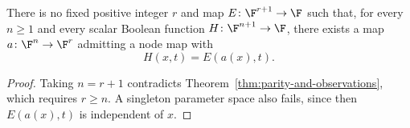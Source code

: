 \begin{corollary}\label{cor:no-universal-evaluation}
There is no fixed positive integer $r$ and map $E\colon\F^{r+1}\to\F$ such that, for every $n\geq1$ and every scalar Boolean function $H\colon\F^{n+1}\to\F$, there exists a map $a\colon\F^n\to\F^r$ admitting a node map with
\[
    H(x,t)=E(a(x),t).
\]
\end{corollary}

\begin{proof}
Taking $n=r+1$ contradicts Theorem~\ref{thm:parity-and-observations}, which requires $r\geq n$. A singleton parameter space also fails, since then $E(a(x),t)$ is independent of $x$.
\end{proof}
